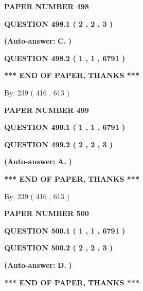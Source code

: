 \documentclass[12pt]{article}
\begin{document}
   
 {\textbf{ \Large{ PAPER NUMBER  498  }}}
   
   
   
   
  
  
{\textbf{\large{QUESTION
498.1 
 ( 2 , 2 , 3 )
}}}
 
 
{\textbf{(Auto-answer:}}
{\textbf{\large{
C.}}}
{\textbf{)}}
 
 
  
  
{\textbf{\large{QUESTION
498.2 
 ( 1 , 1 , 6791 )
}}}
   
   
   
   
\vspace{1.0in} 
{\textbf{\large{ *** END OF PAPER, THANKS *** }}} 
   
   
\hspace{1.0in} By: 
 239 ( 416 ,  613 )
   
   
   
   
\newpage 
\setcounter{page}{ 
   499001 } 
   
   
 {\textbf{ \Large{ PAPER NUMBER  499  }}}
   
   
   
   
  
  
{\textbf{\large{QUESTION
499.1 
 ( 1 , 1 , 6791 )
}}}
  
  
{\textbf{\large{QUESTION
499.2 
 ( 2 , 2 , 3 )
}}}
 
 
{\textbf{(Auto-answer:}}
{\textbf{\large{
A.}}}
{\textbf{)}}
 
 
   
   
   
   
\vspace{1.0in} 
{\textbf{\large{ *** END OF PAPER, THANKS *** }}} 
   
   
\hspace{1.0in} By: 
 239 ( 416 ,  613 )
   
   
   
   
\newpage 
\setcounter{page}{ 
   500001 } 
   
   
 {\textbf{ \Large{ PAPER NUMBER  500  }}}
   
   
   
   
  
  
{\textbf{\large{QUESTION
500.1 
 ( 1 , 1 , 6791 )
}}}
  
  
{\textbf{\large{QUESTION
500.2 
 ( 2 , 2 , 3 )
}}}
 
 
{\textbf{(Auto-answer:}}
{\textbf{\large{
D.}}}
{\textbf{)}}
 
 
   
   
   
   
\vspace{1.0in} 
{\textbf{\large{ *** END OF PAPER, THANKS *** }}} 
   
\end{document}
